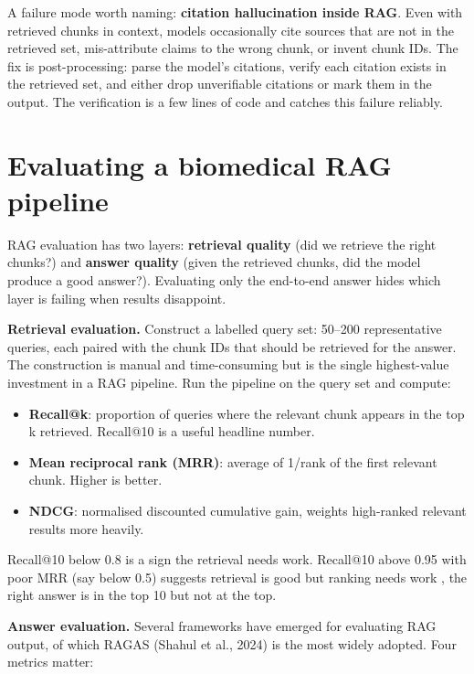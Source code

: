 \documentclass[
  letterpaper,
  11pt]{scrbook}
\providecommand{\tightlist}{%
  \setlength{\itemsep}{0pt}\setlength{\parskip}{0pt}}
\begin{document}
A failure mode worth naming: \textbf{citation hallucination inside RAG}.
Even with retrieved chunks in context, models occasionally cite sources
that are not in the retrieved set, mis-attribute claims to the wrong
chunk, or invent chunk IDs. The fix is post-processing: parse the
model's citations, verify each citation exists in the retrieved set, and
either drop unverifiable citations or mark them in the output. The
verification is a few lines of code and catches this failure reliably.

\section{Evaluating a biomedical RAG
pipeline}\label{evaluating-a-biomedical-rag-pipeline}

RAG evaluation has two layers: \textbf{retrieval quality} (did we
retrieve the right chunks?) and \textbf{answer quality} (given the
retrieved chunks, did the model produce a good answer?). Evaluating only
the end-to-end answer hides which layer is failing when results
disappoint.

\textbf{Retrieval evaluation.} Construct a labelled query set: 50--200
representative queries, each paired with the chunk IDs that should be
retrieved for the answer. The construction is manual and time-consuming
but is the single highest-value investment in a RAG pipeline. Run the
pipeline on the query set and compute:

\begin{itemize}
\tightlist
\item
  \textbf{Recall@k}: proportion of queries where the relevant chunk
  appears in the top k retrieved. Recall@10 is a useful headline number.
\item
  \textbf{Mean reciprocal rank (MRR)}: average of 1/rank of the first
  relevant chunk. Higher is better.
\item
  \textbf{NDCG}: normalised discounted cumulative gain, weights
  high-ranked relevant results more heavily.
\end{itemize}

Recall@10 below 0.8 is a sign the retrieval needs work. Recall@10 above
0.95 with poor MRR (say below 0.5) suggests retrieval is good but
ranking needs work , the right answer is in the top 10 but not at the
top.

\textbf{Answer evaluation.} Several frameworks have emerged for
evaluating RAG output, of which RAGAS (Shahul et al., 2024) is the most
widely adopted. Four metrics matter:
\end{document}
